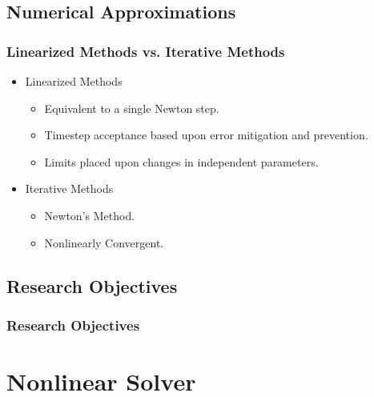 \documentclass[compress,xcolor=table]{beamer}
\begin{document}
\subsection[Numerical Approximations]{Numerical Approximations}
\begin{frame}
\frametitle{Linearized Methods vs. Iterative Methods}

\begin{itemize}
\item{Linearized Methods
\begin{itemize}
\item{Equivalent to a single Newton step.}
\item{Timestep acceptance based upon error mitigation and prevention.}
\item{Limits placed upon changes in independent parameters.}
\end{itemize}
}
\item{Iterative Methods
\begin{itemize}
\item{Newton's Method.}
\item{Nonlinearly Convergent.}
\end{itemize}
}
\end{itemize}

\begin{figure}[t]
\centering
\resizebox{1.0\textwidth}{!}{

}
\end{figure}

\end{frame}
\subsection[Research Objectives]{Research Objectives}
\begin{frame}
\frametitle{Research Objectives}

\begin{figure}[t]
\centering
\resizebox{!}{0.7\textheight}{

}
\end{figure}

\end{frame}
\section[Nonlinear]{Nonlinear Solver}
\end{document}
